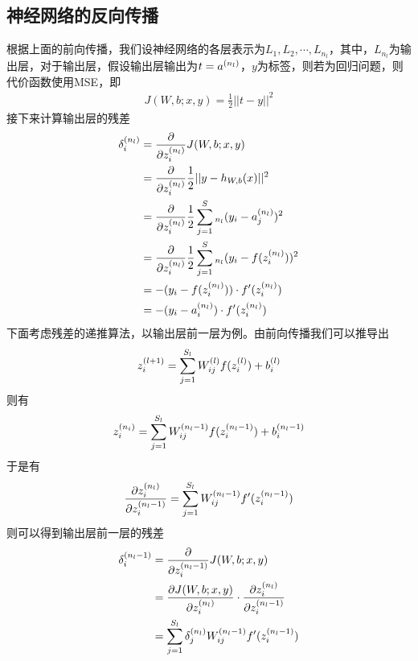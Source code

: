 \subsection{神经网络的反向传播}
根据上面的前向传播，我们设神经网络的各层表示为$L_1,L_2,\cdots,L_{n_l}$，其中，$L_{n_l}$为输出层，对于输出层，假设输出层输出为$t=\sample{a}{n_l}$，$y$为标签，则若为回归问题，则代价函数使用MSE，即
\begin{eqnarray}
J(W,b;x,y)=\frac{1}{2}||t-y||^2
\end{eqnarray}
接下来计算输出层的残差
\begin{eqnarray}
\begin{aligned}
\samplet{\delta}{n_l}{i}&=\frac{\partial}{\partial \samplet{z}{n_l}{i}}J(W,b;x,y)\\
&=\frac{\partial}{\partial \samplet{z}{n_l}{i}}\frac{1}{2}||y-h_{W,b}(x)||^2\\
&=\frac{\partial}{\partial \samplet{z}{n_l}{i}}\frac{1}{2}\sum_{j=1}^S{_{n_l}}(y_i-\samplet{a}{n_l}{j})^2\\
&=\frac{\partial}{\partial \samplet{z}{n_l}{i}}\frac{1}{2}\sum_{j=1}^S{_{n_l}}(y_i-f(\samplet{z}{n_l}{i}))^2\\
&=-(y_i-f(\samplet{z}{n_l}{i}))\cdot f'(\samplet{z}{n_l}{i})\\
&=-(y_i-\samplet{a}{n_l}{i})\cdot f'(\samplet{z}{n_l}{i})
\end{aligned}
\end{eqnarray}
下面考虑残差的递推算法，以输出层前一层为例。由前向传播我们可以推导出
\begin{eqnarray}
\samplet{z}{l+1}{i}=\sum_{j=1}^{S_l}\samplet{W}{l}{ij}f(\samplet{z}{l}{i})+\samplet{b}{l}{i}
\end{eqnarray}
则有
\begin{eqnarray}
\samplet{z}{n_i}{i}=\sum_{j=1}^{S_l} \samplet{W}{n_l-1}{ij}f(\samplet{z}{n_l-1}{i})+\samplet{b}{n_l-1}{i}
\end{eqnarray}
于是有
\begin{eqnarray}
\frac{\partial \samplet{z}{n_l}{i}}{\partial \samplet{z}{n_l-1}{i}}=\sum_{j=1}^{S_l}\samplet{W}{n_l-1}{ij}f'(\samplet{z}{n_l-1}{i})
\end{eqnarray}
则可以得到输出层前一层的残差
\begin{eqnarray}
\begin{aligned}
\samplet{\delta}{n_l-1}{i} &= \frac{\partial}{\partial \samplet{z}{n_l-1}{i}}J(W,b;x,y)\\
&= \frac{\partial J(W,b;x,y)}{\partial \samplet{z}{n_l}{i}}\cdot\frac{\partial \samplet{z}{n_l}{i}}{\partial \samplet{z}{n_l-1}{i}}\\
&= \sum_{j=1}^{S_l}\samplet{\delta}{n_l}{j}\samplet{W}{n_l-1}{ij}f'(\samplet{z}{n_l-1}{i})
\end{aligned}
\end{eqnarray}
